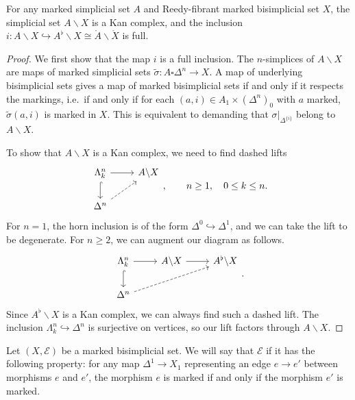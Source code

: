\documentclass[main.tex]{subfiles}
\begin{document}
\begin{lemma}
  For any marked simplicial set $A$ and Reedy-fibrant marked bisimplicial set $X$, the simplicial set $A \backslash X$ is a Kan complex, and the inclusion $i\colon A \backslash X \hookrightarrow A^{\flat} \backslash X \cong \mathring{A} \backslash \mathring{X}$ is full.
\end{lemma}
\begin{proof}
  We first show that the map $i$ is a full inclusion. The $n$-simplices of $A \backslash X$ are maps of marked simplicial sets $\tilde{\sigma}\colon A \square \Delta^{n} \to X$. A map of underlying bisimplicial sets gives a map of marked bisimplicial sets if and only if it respects the markings, i.e.\ if and only if for each $(a, i) \in A_{1} \times (\Delta^{n})_{0}$ with $a$ marked, $\tilde{\sigma}(a, i)$ is marked in $X$. This is equivalent to demanding that $\sigma|_{\Delta^{\{i\}}}$ belong to $A \backslash X$.

  To show that $A \backslash X$ is a Kan complex, we need to find dashed lifts
  \begin{equation*}
    \begin{tikzcd}
      \Lambda^{n}_{k}
      \arrow[r]
      \arrow[d, hook]
      & A \backslash X
      \\
      \Delta^{n}
      \arrow[ur, dashed]
    \end{tikzcd},
    \qquad n \geq 1,\quad 0 \leq k \leq n.
  \end{equation*}
  For $n = 1$, the horn inclusion is of the form $\Delta^{0} \hookrightarrow \Delta^{1}$, and we can take the lift to be degenerate. For $n \geq 2$, we can augment our diagram as follows.
  \begin{equation*}
    \begin{tikzcd}
      \Lambda^{n}_{k}
      \arrow[r]
      \arrow[d, hook]
      & A \backslash X
      \arrow[r]
      & A^{\flat} \backslash X
      \\
      \Delta^{n}
      \arrow[urr, dashed]
    \end{tikzcd}.
  \end{equation*}
  Since $A^{\flat} \backslash X$ is a Kan complex, we can always find such a dashed lift. The inclusion $\Lambda^{n}_{k} \hookrightarrow \Delta^{n}$ is surjective on vertices, so our lift factors through $A \backslash X$.
\end{proof}

\begin{definition}
  \label{def:respects_path_components}
  Let $(X, \mathcal{E})$ be a marked bisimplicial set. We will say that $\mathcal{E}$  if it has the following property: for any map $\Delta^{1} \to X_{1}$ representing an edge $e \to e'$ between morphisms $e$ and $e'$, the morphism $e$ is marked if and only if the morphism $e'$ is marked.
\end{definition}
\end{document}
